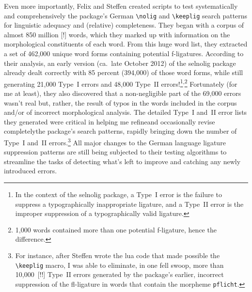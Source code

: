 \documentclass[11pt]{article}
\newcommand{\pkg}[1]{\textsf{#1}}
\newcommand{\opt}[1]{\texttt{#1}}
\newcommand{\cmmd}[1]{\texttt{\textbackslash #1}}
\begin{document}
Even more importantly, Felix and Steffen created scripts to test systematically and comprehensively the package's German \cmmd{nolig} and \cmmd{keeplig} search patterns for linguistic adequacy and (relative) completeness.
They began with a corpus of almost 850 million [!] words, which they marked up with information on the morphological constituents of each word. From this huge word list, they extracted a set of 462,000 unique word forms containing potential f-ligatures.
According to their analysis, an early version (ca.\ late October 2012) of the \pkg{selnolig} package already dealt correctly with 85 percent (394,000) of those word forms, while still generating 21,000 Type~I errors and 48,000 Type~II errors!\footnote{In the context of the \pkg{selnolig} package, a Type~I error is the failure to suppress a typographically inappropriate ligature, and a Type~II error is the improper suppression of a typographically valid ligature.}\textsuperscript{,}\footnote{1,000 words contained more than one potential f-ligature, hence the difference.} 
Fortunately (for me at least), they also discovered that a non-negligible part of the 69,000 errors wasn't real but, rather, the result of typos in the words included in the corpus and/or of incorrect morphological analysis. The detailed Type~I and~II error lists they generated were critical in helping me refine\textemdash and occasionally revise completely\textemdash the package's search patterns, rapidly bringing down the number of Type~I and~II errors.\footnote{For instance, after Steffen wrote the lua code that made possible the \cmmd{keeplig} macro, I was able to eliminate, in one fell swoop, more than 10,000~[!!] Type~II errors generated by the package's earlier, incorrect suppression of the fl-ligature in words that contain the morpheme \opt{pflicht}. } All major changes to the German language ligature suppression patterns are still being subjected to their testing algorithms to streamline the tasks of detecting what's left to improve and catching any newly introduced errors.
\end{document}
